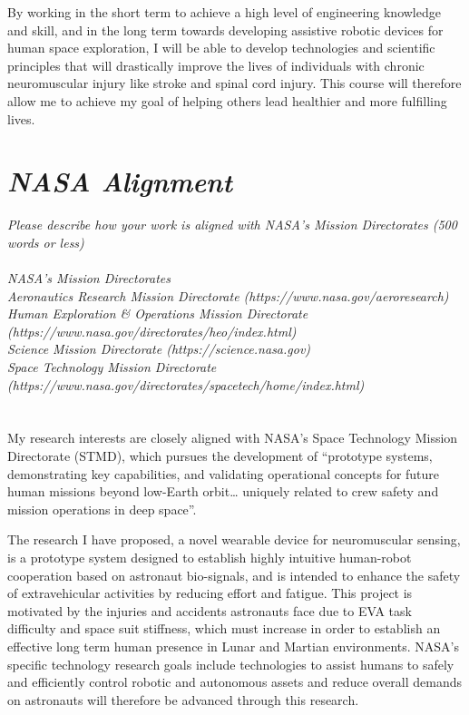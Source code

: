 \documentclass{article}
\begin{document}
By working in the short term to achieve a high level of engineering knowledge and skill, and in the long term towards developing assistive robotic devices for human space exploration, I will be able to develop technologies and scientific principles that will drastically improve the lives of individuals with chronic neuromuscular injury like stroke and spinal cord injury. This course will therefore allow me to achieve my goal of helping others lead healthier and more fulfilling lives.

\clearpage

\section{\emph{NASA Alignment}} 

\small{\emph{Please describe how your work is aligned with NASA's Mission Directorates
(500 words or less)\\\\
NASA's Mission Directorates\\
Aeronautics Research Mission Directorate (https://www.nasa.gov/aeroresearch)\\
Human Exploration & Operations Mission Directorate (https://www.nasa.gov/directorates/heo/index.html)\\
Science Mission Directorate (https://science.nasa.gov)\\
Space Technology Mission Directorate (https://www.nasa.gov/directorates/spacetech/home/index.html)\\
}}\\\\
\large
My research interests are closely aligned with NASA’s Space Technology Mission Directorate (STMD), which pursues the development of “prototype systems, demonstrating key capabilities, and validating operational concepts for future human missions beyond low-Earth orbit… uniquely related to crew safety and mission operations in deep space”. 

The research I have proposed, a novel wearable device for neuromuscular sensing, is a prototype system designed to establish highly intuitive human-robot cooperation based on astronaut bio-signals, and is intended to enhance the safety of extravehicular activities by reducing effort and fatigue. This project is motivated by the injuries and accidents astronauts face due to EVA task difficulty and space suit stiffness, which must increase in order to establish an effective long term human presence in Lunar and Martian environments. NASA’s specific technology research goals include technologies to assist humans to safely and efficiently control robotic and autonomous assets and reduce overall demands on astronauts will therefore be advanced through this research.
\end{document}
